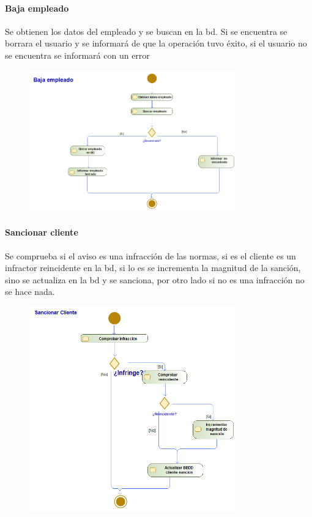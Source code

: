 \paragraph{Baja empleado}
Se obtienen los datos del empleado y se buscan en la \gls{bd}. Si se encuentra se borrara el usuario y se informará de que la operación tuvo éxito, si el usuario no se encuentra se informará con un error
\begin{figure}[H]
    \centering
    \includegraphics[width=0.8\textwidth]{Use_Cases/Baja empleado.png}
\end{figure}
\paragraph{Sancionar cliente}
Se comprueba si el aviso es una infracción de las normas, si es el cliente es un infractor reincidente en la \gls{bd}, si lo es se incrementa la magnitud de la sanción, sino se actualiza en la \gls{bd} y se sanciona, por otro lado si no es una infracción no se hace nada.
\begin{figure}[H]
    \centering
    \includegraphics[width=0.8\textwidth]{Use_Cases/Sancionar Cliente.png}
\end{figure}

